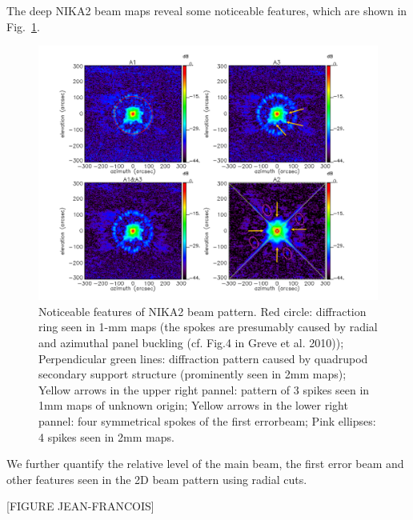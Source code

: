 The deep NIKA2 beam maps reveal some noticeable features, which are shown in Fig.~\ref{fig:features}. 

\begin{figure}
\begin{center}
  \includegraphics[clip, angle=0, scale=0.4]{Figures/Beams_features.pdf}
\caption{Noticeable features of NIKA2 beam pattern. Red circle: diffraction ring seen in 1-mm maps (the spokes are presumably caused by radial and azimuthal panel buckling (cf. Fig.4 in Greve et al. 2010)); Perpendicular green lines: diffraction pattern caused by quadrupod secondary support structure (prominently seen in 2mm maps); Yellow arrows in the upper right pannel: pattern of 3 spikes seen in 1mm maps of unknown origin; Yellow arrows in the lower right pannel: four symmetrical spokes of the first errorbeam; Pink ellipses: 4 spikes seen in 2mm maps.}
\label{fig:features}
\end{center}
\end{figure}

We further quantify the relative level of the main beam, the first error beam and other features seen in the 2D beam pattern using radial cuts.

[FIGURE JEAN-FRANCOIS]

